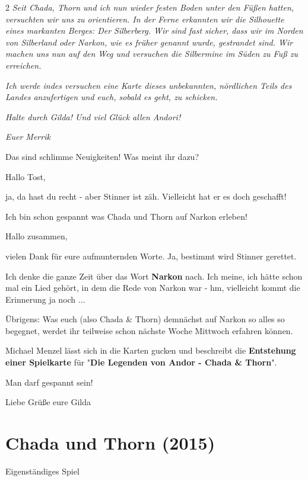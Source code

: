 \documentclass[10pt, a4paper, oneside]{book}
\newcommand{\fillbreak}{\vspace*{\fill}\columnbreak}
\newcommand{\produkt}[1]{%
    \section{#1}%
    \label{Produkt: #1}%
}
\begin{document}
\begin{multicols}{2}
\textit{Seit Chada, Thorn und ich nun wieder festen Boden unter den Füßen hatten, versuchten wir uns zu orientieren. In der Ferne erkannten wir die Silhouette eines markanten Berges: Der Silberberg. Wir sind fast sicher, dass wir im Norden von Silberland oder Narkon, wie es früher genannt wurde, gestrandet sind. Wir machen uns nun auf den Weg und versuchen die Silbermine im Süden zu Fuß zu erreichen.}

\textit{Ich werde indes versuchen eine Karte dieses unbekannten, nördlichen Teils des Landes anzufertigen und euch, sobald es geht, zu schicken.}

\textit{Halte durch Gilda! Und viel Glück allen Andori!}

\textit{Euer Merrik}

Das sind schlimme Neuigkeiten! Was meint ihr dazu?

Hallo Tost,

ja, da hast du recht - aber Stinner ist zäh. Vielleicht hat er es doch geschafft!

Ich bin schon gespannt was Chada und Thorn auf Narkon erleben!


Hallo zusammen,

vielen Dank für eure aufmunternden Worte. Ja, bestimmt wird Stinner gerettet.

Ich denke die ganze Zeit über das Wort \textbf{Narkon} nach. Ich meine, ich hätte schon mal ein Lied gehört, in dem die Rede von Narkon war - hm, vielleicht kommt die Erinnerung ja noch ...

Übrigens: Was euch (also Chada \& Thorn) demnächst auf Narkon so alles so begegnet, werdet ihr teilweise schon nächste Woche Mittwoch erfahren können.

Michael Menzel lässt sich in die Karten gucken und beschreibt die \textbf{Entstehung einer Spielkarte} für "\textbf{Die Legenden von Andor - Chada \& Thorn}".


Man darf gespannt sein!

Liebe Grüße
eure Gilda













\fillbreak
\produkt{Chada und Thorn (2015)}

\begin{center}
    Eigenständiges Spiel
\end{center}


\end{multicols}
\end{document}
